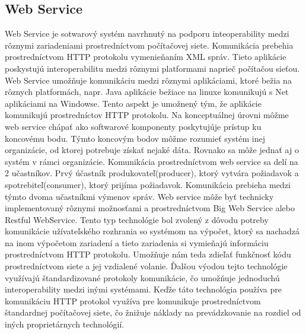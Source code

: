 \subsection{Web Service}
Web Service  je sotwarový systém navrhnutý na podporu inteoperability medzi rôznymi zariadeniami prostredníctvom počítačovej siete. Komunikácia prebehia prostredníctvom HTTP protokolu vymenieňaním XML správ. Tieto aplikácie poskystujú interoperabilitu medzi rôznymi platformami naprieč počítačou sieťou. Web Service umožňuje komunikáciu medzi rôznymi aplikáciami, ktoré bežia na rôznych platformách, napr. Java aplikácie bežiace na linuxe komunikujú s Net aplikáciami na Windowse. Tento aspekt je umožnený tým, že aplikácie komunikujú prostredníctov HTTP protokolu. Na konceptuálnej úrovni môžme web service chápať ako softwarové komponenty poskytujúje prístup ku koncovému bodu. Týmto koncovým bodov môžme rozumieť systém inej organizácie, od ktorej potrebuje získať nejaké dáta. Rovnako sa môže jednať aj o systém v rámci organizácie. Komunikácia prostredníctvom web service sa delí na 2 učastníkov. Prvý účastník produkovateľ(producer), ktorý vytvára požiadavok a spotrebiteľ(consumer), ktorý prijíma požiadavok. Komunikácia prebieha medzi týmto dvoma učastníkmi výmenov správ. Web service môže byť technicky implementovaný rôznymi možnosťami a prostredníctvom Big Web Service alebo Restful WebService. Tento typ technológie bol zvolený z dôvodu potreby komunikácie užívateľského rozhrania so systémom na výpočet, ktorý sa nachadzá na inom výpočetom zariadení a tieto zariadenia si vymieňajú informáciu prostredníctvom HTTP protokolu. Umožňuje nám teda zdieľať funkčnosť kódu prostredníctvom siete a jej vzdialené volanie. Ďalšou výodou tejto technológie využívajú štandardizované protokoly komunikácie, čo umožňuje jednoduchú interoperability medzi inými systémami. Keďže táto technológia používa pre komunikáciu HTTP protokol využíva pre komunikuje prostredníctvom štandardnej počítačovej siete, čo žnižuje náklady na prevádzkovanie na rozdiel od iných proprietárnych technológií.

